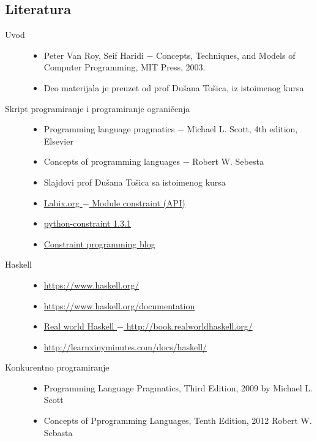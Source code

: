 \documentclass[main.tex]{subfiles}
\begin{document}
\begin{boxnaslovi}
\section{Literatura}
\end{boxnaslovi} 							%
\begin{description}
\item[Uvod] \hfill
\begin{itemize}
\item Peter Van Roy, Seif Haridi $-$ Concepts, Techniques, and Models of Computer Programming, MIT Press, 2003.
\item Deo materijala je preuzet od prof Dušana Tošica, iz istoimenog kursa
\end{itemize}

\item[Skript programiranje i programiranje ograničenja] \hfill
\begin{itemize}
\item Programming language pragmatics $-$ Michael L. Scott, 4th edition, Elsevier
\item Concepts of programming languages $-$ Robert W. Sebesta
\item Slajdovi prof Dušana Tošica sa istoimenog kursa
\item \href{http://labix.org/doc/constraint/}
{Labix.org $-$ Module constraint (API)}
\item \href{ https://pypi.python.org/pypi/python-constraint}
{python-constraint 1.3.1 }
\item \href{http://www.hakank.org/constraint_programming_blog/}
{Constraint programming blog}
\end{itemize}

\item[Haskell] \hfill
\begin{itemize}
\item \href{https://www.haskell.org/}{https://www.haskell.org/}
\item \href{https://www.haskell.org/documentation}{https://www.haskell.org/documentation}
\item \href{http://book.realworldhaskell.org/}{Real world Haskell $-$ http://book.realworldhaskell.org/}
\item \href{http://learnxinyminutes.com/docs/haskell/}{http://learnxinyminutes.com/docs/haskell/}
\end{itemize}

\item[Konkurentno programiranje] \hfill
\begin{itemize}
\item Programming Language Pragmatics, Third Edition, 2009 by Michael L. Scott
\item Concepts of Pprogramming Languages, Tenth Edition, 2012 Robert W. Sebasta
\end{itemize}


\end{description}
\end{document}
